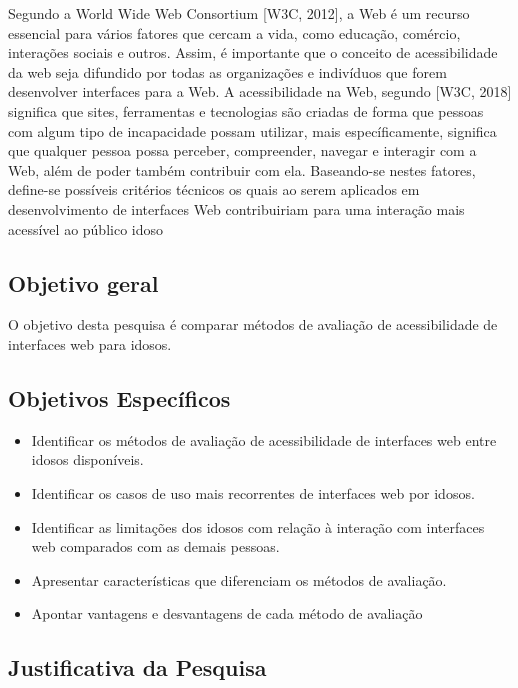 \documentclass[12pt]{article}
\begin{document}
    Segundo a World Wide Web Consortium [W3C, 2012], a Web é um recurso essencial para vários fatores que cercam a vida, como educação, comércio, interações sociais e outros. Assim, é importante que o conceito de acessibilidade da web seja difundido por todas as organizações e indivíduos que forem desenvolver interfaces para a Web. A acessibilidade na Web, segundo [W3C, 2018] significa que sites, ferramentas e tecnologias são criadas de forma que pessoas com algum tipo de incapacidade possam utilizar, mais específicamente, significa que qualquer pessoa possa perceber, compreender, navegar e interagir com a Web, além de poder também contribuir com ela. Baseando-se nestes fatores, define-se possíveis critérios técnicos os quais ao serem aplicados em desenvolvimento de interfaces Web contribuiriam para uma interação mais acessível ao público idoso

\subsection{Objetivo geral}
    O objetivo desta pesquisa é comparar métodos de avaliação de acessibilidade de interfaces web para idosos.

\subsection{Objetivos Específicos}

\begin{itemize}
    \item{Identificar os métodos de avaliação de acessibilidade de interfaces web entre idosos disponíveis.}

    \item{Identificar os casos de uso mais recorrentes de interfaces web por idosos.}

    \item{Identificar as limitações dos idosos com relação à interação com interfaces web comparados com as demais pessoas.}
    \item{Apresentar características que diferenciam os métodos de avaliação.}

    \item{Apontar vantagens e desvantagens de cada método de avaliação}

\end{itemize}

\subsection{Justificativa da Pesquisa}
\end{document}
